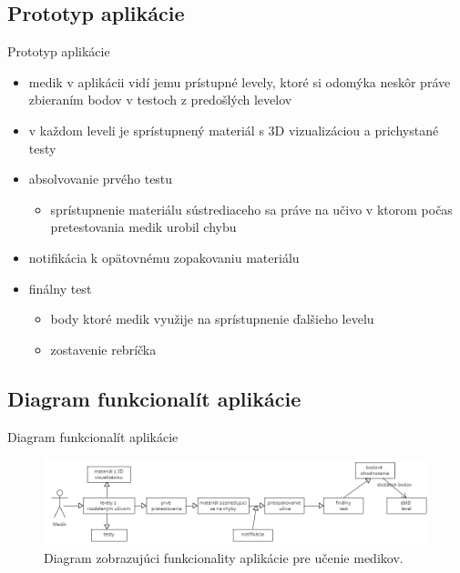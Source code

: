 \documentclass[10pt]{beamer}
\begin{document}
\subsection{Prototyp aplikácie}\label{gamifikacia:aplikacia}
    \begin{frame}{Prototyp aplikácie}
      \begin{itemize}
  \setlength\itemsep{2em}
\item medik v aplikácii vidí jemu prístupné levely, ktoré si odomýka neskôr práve zbieraním bodov v testoch z predošlých levelov
	
\item v každom leveli je sprístupnený materiál s 3D vizualizáciou a prichystané testy
	
\item absolvovanie prvého testu
	\begin{itemize}
	\item sprístupnenie materiálu sústrediaceho sa práve na učivo v ktorom počas pretestovania medik urobil chybu
	\end{itemize}
	
\item notifikácia k opätovnému zopakovaniu materiálu

\item finálny test
	\begin{itemize}
	\item body ktoré medik využije na sprístupnenie ďalšieho levelu
	\item zostavenie rebríčka
	\end{itemize}

\end{itemize}
\end{frame}

\subsection{Diagram funkcionalít aplikácie}\label{gamifikacia:diagram}
    \begin{frame}{Diagram funkcionalít aplikácie}
     
\begin{figure}[tbh]
\centering
\includegraphics[scale=0.35]{dia.png}
\caption{Diagram zobrazujúci funkcionality aplikácie pre učenie medikov.}
\label{diagram}
\end{figure}

\end{frame}
    
\end{document}
